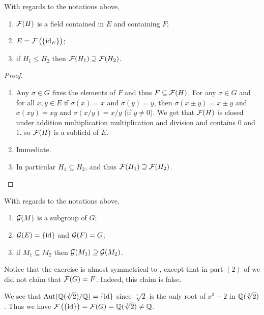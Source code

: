 \documentclass[11pt,a4paper]{article}
\begin{document}
\begin{proposition}
  \label{prop:notations}
  With regards to the notations above,
  \begin{enumerate}
    \item[(1)] $\mathcal F(H)$ is a field contained in $E$ and containing $F$;
    \item[(2)] $E = \FF\del{\set{\id_E}}$;
    \item[(3)] if $H_1 \leqslant H_2$ then $\mathcal F(H_1) \supseteq \mathcal F(H_2)$.
  \end{enumerate}
\end{proposition}
\begin{proof} \phantom{}
  \begin{enumerate}
    \item[(1)] Any $\sigma \in G$ fixes the elements of $F$ and
      thus $F \subseteq \mathcal F(H)$.
      For any $\sigma \in G$ and for all $x,y \in E$ if $\sigma(x) = x$
      and $\sigma(y) = y$, then $\sigma(x \pm y) = x \pm y$ and
      $\sigma(xy) = xy$ and $\sigma(x/y) = x/y$ (if $y \neq 0$).
      We get that $\mathcal F(H)$ is closed under addition multiplication
      multiplication and division and contains $0$ and $1$,
      so $\mathcal F(H)$ is a subfield of $E$.
    \item[(2)] Immediate.
    \item[(3)] In particular $H_1 \subseteq H_2$,
      and thus $\mathcal F(H_1) \supseteq \mathcal F(H_2)$.
  \end{enumerate}
\end{proof}

\begin{exercise}
  With regards to the notations above,
  \begin{enumerate}
    \item[(1)] $\mathcal G(M)$ is a subgroup of $G$;
    \item[(2)] $\mathcal G(E) = \left\{\operatorname{id}\right\}$ and $\mathcal G(F) = G$;
    \item[(3)] if $M_1 \subseteq M_2$ then $\mathcal G(M_1) \supseteq \mathcal G(M_2)$.
  \end{enumerate}
\end{exercise}

\begin{remark}
  Notice that the exercise is almost symmetrical to ,
  except that in part $(2)$ of 
  we did not claim that $\mathcal F(G) = F$.
  Indeed, this claim is false.
\end{remark}

\begin{example}
  \label{exmp:galois-correspondence-not-inverse-one}
  We see that $\operatorname{Aut}(\mathbb{Q}(\sqrt[3]{2}) / \mathbb{Q}) = \left\{\operatorname{id}\right\}$
  since $\sqrt[3]{2}$ is the only root of $x^3 - 2$ in $\mathbb{Q}(\sqrt[3]{2})$.
  Thus we have $\FF\del{\set{\id}} = \FF(G) = \Q(\sqrt[3]{2}) \neq \Q$.
\end{example}
\end{document}
